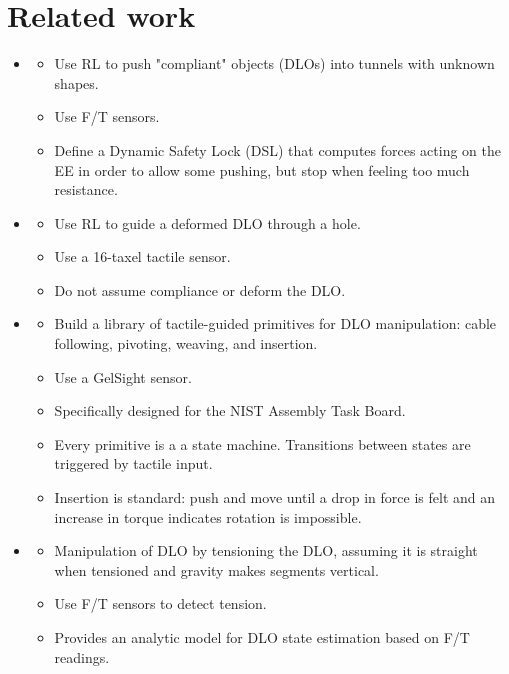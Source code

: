 \section{Related work}
\label{sec:related:work}

\begin{itemize}

    \item \cite{lvw-crcrisb-24}
    \begin{itemize}
        \item Use RL to push "compliant" objects (DLOs) into tunnels with unknown shapes.
        \item Use F/T sensors.
        \item Define a Dynamic Safety Lock (DSL) that computes forces acting on the EE in order to allow some pushing, but stop when feeling too much resistance.
    \end{itemize}
    
    \item \cite{zdpp-dhattfmn-19}
    \begin{itemize}
        \item Use RL to guide a deformed DLO through a hole.
        \item Use a 16-taxel tactile sensor.
        \item Do not assume compliance or deform the DLO.
    \end{itemize}
    
    \item \cite{wjly-cratmp-22}
    \begin{itemize}
        \item Build a library of tactile-guided primitives for DLO manipulation: cable following, pivoting, weaving, and insertion.
        \item Use a GelSight sensor.
        \item Specifically designed for the NIST Assembly Task Board.
        \item Every primitive is a  a state machine. Transitions between states are triggered by tactile input.
        \item Insertion is standard: push and move until a drop in force is felt and an increase in torque indicates rotation is impossible.
    \end{itemize}
    
    \item \cite{slk-ftmdloeffi-22}
    \begin{itemize}
        \item Manipulation of DLO by tensioning the DLO, assuming it is straight when tensioned and gravity makes segments vertical.
        \item Use F/T sensors to detect tension.
        \item Provides an analytic model for DLO state estimation based on F/T readings.
    \end{itemize}
    

\end{itemize}
